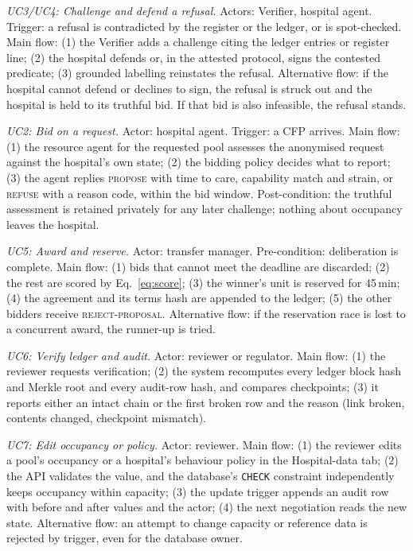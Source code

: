 \emph{UC3/UC4: Challenge and defend a refusal.}
Actors: Verifier, hospital agent. Trigger: a refusal is contradicted by the register or the ledger, or is spot-checked.
Main flow: (1) the Verifier adds a challenge citing the ledger entries or register line; (2) the hospital defends or, in the attested protocol, signs the contested predicate; (3) grounded labelling reinstates the refusal.
Alternative flow: if the hospital cannot defend or declines to sign, the refusal is struck out and the hospital is held to its truthful bid. If that bid is also infeasible, the refusal stands.

\emph{UC2: Bid on a request.}
Actor: hospital agent. Trigger: a CFP arrives.
Main flow: (1) the resource agent for the requested pool assesses the anonymised request against the hospital's own state; (2) the bidding policy decides what to report; (3) the agent replies \textsc{propose} with time to care, capability match and strain, or \textsc{refuse} with a reason code, within the bid window.
Post-condition: the truthful assessment is retained privately for any later challenge; nothing about occupancy leaves the hospital.

\emph{UC5: Award and reserve.}
Actor: transfer manager. Pre-condition: deliberation is complete.
Main flow: (1) bids that cannot meet the deadline are discarded; (2) the rest are scored by Eq.~\eqref{eq:score}; (3) the winner's unit is reserved for 45\,min; (4) the agreement and its terms hash are appended to the ledger; (5) the other bidders receive \textsc{reject-proposal}.
Alternative flow: if the reservation race is lost to a concurrent award, the runner-up is tried.

\emph{UC6: Verify ledger and audit.}
Actor: reviewer or regulator. Main flow: (1) the reviewer requests verification; (2) the system recomputes every ledger block hash and Merkle root and every audit-row hash, and compares checkpoints; (3) it reports either an intact chain or the first broken row and the reason (link broken, contents changed, checkpoint mismatch).

\emph{UC7: Edit occupancy or policy.}
Actor: reviewer. Main flow: (1) the reviewer edits a pool's occupancy or a hospital's behaviour policy in the Hospital-data tab; (2) the API validates the value, and the database's \texttt{CHECK} constraint independently keeps occupancy within capacity; (3) the update trigger appends an audit row with before and after values and the actor; (4) the next negotiation reads the new state.
Alternative flow: an attempt to change capacity or reference data is rejected by trigger, even for the database owner.

